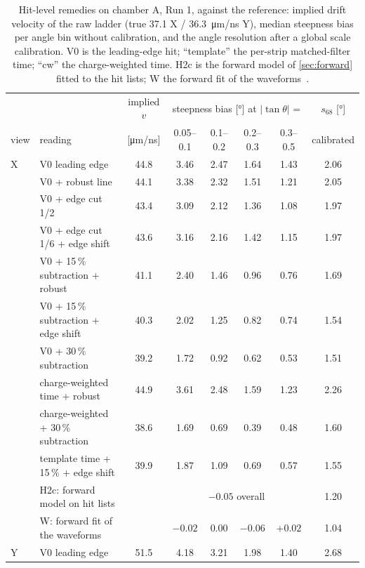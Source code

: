 \begin{table}[t]
  \centering\footnotesize
  \caption{Hit-level remedies on chamber A, Run 1, against the reference: implied drift velocity of the raw ladder (true
  \SI{37.1}{} X / \SI{36.3}{\micro\metre/ns} Y), median steepness bias per angle bin without calibration, and the angle resolution
  after a global scale calibration. V0 is the leading-edge hit; ``template'' the per-strip matched-filter time; ``cw'' the
  charge-weighted time. H2c is the forward model of \cref{sec:forward} fitted to the hit lists; W the forward fit of the
  waveforms~\cite{paperII}.}
  \label{tab:remedies}
  \begin{tabular}{@{}llcccccc@{}}
    \toprule
    & & implied $v$ & \multicolumn{4}{c}{steepness bias [\si{\degree}] at $|\tan\theta|$ =} & $s_{68}$ [\si{\degree}] \\
    view & reading & [\si{\micro\metre/ns}] & 0.05--0.1 & 0.1--0.2 & 0.2--0.3 & 0.3--0.5 & calibrated \\
    \midrule
    X & V0 leading edge & 44.8 & 3.46 & 2.47 & 1.64 & 1.43 & 2.06 \\
      & V0 + robust line & 44.1 & 3.38 & 2.32 & 1.51 & 1.21 & 2.05 \\
      & V0 + edge cut 1/2 & 43.4 & 3.09 & 2.12 & 1.36 & 1.08 & 1.97 \\
      & V0 + edge cut 1/6 + edge shift & 43.6 & 3.16 & 2.16 & 1.42 & 1.15 & 1.97 \\
      & V0 + 15\,\% subtraction + robust & 41.1 & 2.40 & 1.46 & 0.96 & 0.76 & 1.69 \\
      & V0 + 15\,\% subtraction + edge shift & 40.3 & 2.02 & 1.25 & 0.82 & 0.74 & 1.54 \\
      & V0 + 30\,\% subtraction & 39.2 & 1.72 & 0.92 & 0.62 & 0.53 & 1.51 \\
      & charge-weighted time + robust & 44.9 & 3.61 & 2.48 & 1.59 & 1.23 & 2.26 \\
      & charge-weighted + 30\,\% subtraction & 38.6 & 1.69 & 0.69 & 0.39 & 0.48 & 1.60 \\
      & template time + 15\,\% + edge shift & 39.9 & 1.87 & 1.09 & 0.69 & 0.57 & 1.55 \\
      & H2c: forward model on hit lists & & \multicolumn{4}{c}{$-0.05$ overall} & 1.20 \\
      & W: forward fit of the waveforms & & $-0.02$ & $0.00$ & $-0.06$ & $+0.02$ & 1.04 \\
    \midrule
    Y & V0 leading edge & 51.5 & 4.18 & 3.21 & 1.98 & 1.40 & 2.68 \\

\end{tabular}
\end{table}
